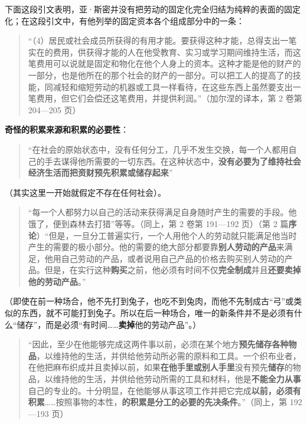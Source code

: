 下面这段引文表明，亚·斯密并没有把劳动的固定化完全归结为纯粹的表面的固定化；在这段引文中，有他列举的固定资本各个组成部分中的一条：

\begin{quote}“（4）居民或社会成员所获得的有用才能。要获得这种才能，总得支出一笔实在的费用，供获得才能的人在他受教育、实习或学习期间维持生活，而这笔费用可以说就是固定和物化在他个人身上的资本。这种才能是他的财产的一部分，也是他所在的那个社会的财产的一部分。可以把工人的提高了的技能，同减轻和缩短劳动的机器或工具一样看待，在这些东西上虽然要支出一笔费用，但它们会偿还这笔费用，并提供利润。”（加尔涅的译本，第 2 卷第 204—205 页）\end{quote}

\textbf{奇怪的积累来源和积累的必要性}：

\begin{quote}“在社会的原始状态中，没有任何分工，几乎不发生交换，每一个人都用自己的手去谋得他所需要的一切东西。在这种状态中，\textbf{没有必要为了维持社会经济生活而把资财预先积累或储存起来}”\end{quote}

（其实这里一开始就假定不存在任何社会）。

\begin{quote}“每一个人都努力以自己的活动来获得满足自身随时产生的需要的手段。他饿了，便到森林去打猎”等等。（同上，第 2 卷第 191—192 页）（第 2 篇\textbf{序论}）“但是，一旦分工普遍实行，一个人用他个人的劳动就只能满足他当时产生的需要的极小部分。他的需要的绝大部分都要靠\textbf{别人劳动的产品}来满足，他用自己劳动的产品，或者说用自己产品的价格去购买别人劳动的产品。但是，在实行这种\textbf{购买}之前，他必须有时间不仅\textbf{完全制成}并且\textbf{还要卖掉他的劳动产品}。”\end{quote}

（即使在前一种场合，他不先打到兔子，也吃不到兔肉，而他不先制成古“弓”或类似的东西，就不可能打到兔子。所以在后一种场合，唯一的新条件并不是必须有什么“储存”，而是必须“有时间……\textbf{卖掉}他的劳动产品”。）

\begin{quote}“因此，至少在他能够完成这两件事以前，必须在某个地方\textbf{预先储存各种物品}，以维持他的生活，并供给他劳动所必需的原料和工具。一个织布业者，在他把麻布织成并且卖掉以前，如果\textbf{在他手里或别人手里}没有预先\textbf{储存}的物品，以维持他的生活，并供给他劳动所需的工具和材料，他是\textbf{不能全力从事}自己的专业的。十分明显，在他能够从事这项工作并把它完成\textbf{以前，必须有积累}……按照事物的本性，\textbf{的积累是分工的必要的先决条件}。”（同上，第 192—193 页）\end{quote}

